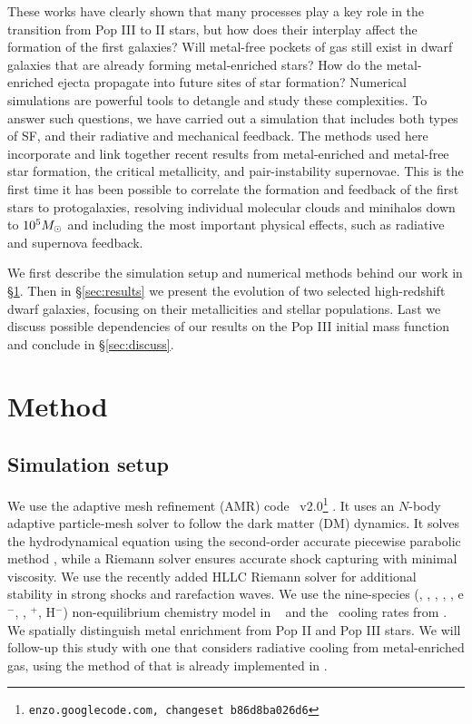 \documentclass[apjl]{emulateapj}
\begin{document}
These works have clearly shown that many processes play a key role in
the transition from Pop III to II stars, but how does their interplay
affect the formation of the first galaxies?  Will metal-free pockets
of gas still exist in dwarf galaxies that are already forming
metal-enriched stars?  How do the metal-enriched ejecta propagate into
future sites of star formation?  Numerical simulations are powerful
tools to detangle and study these complexities.  To answer such
questions, we have carried out a simulation that includes both types
of SF, and their radiative and mechanical feedback.  The methods used
here incorporate and link together recent results from metal-enriched
and metal-free star formation, the critical metallicity, and
pair-instability supernovae.  This is the first time it has been
possible to correlate the formation and feedback of the first stars to
protogalaxies, resolving individual molecular clouds and minihalos
down to $10^5 \Ms$ and including the most important physical effects,
such as radiative and supernova feedback.

We first describe the simulation setup and numerical methods behind
our work in \S\ref{sec:setup}.  Then in \S\ref{sec:results} we present
the evolution of two selected high-redshift dwarf galaxies, focusing
on their metallicities and stellar populations.  Last we discuss
possible dependencies of our results on the Pop III initial mass
function and conclude in \S\ref{sec:discuss}.

\section{Method}
\label{sec:setup}

\subsection{Simulation setup}

We use the adaptive mesh refinement (AMR) code
\enzo~v2.0\footnote{\texttt{enzo.googlecode.com, changeset
    b86d8ba026d6}} \citep{OShea2004}.  It uses an $N$-body adaptive
particle-mesh solver \citep{Efstathiou85, Couchman91, BryanNorman1997}
to follow the dark matter (DM) dynamics.  It solves the hydrodynamical
equation using the second-order accurate piecewise parabolic method
\citep{Woodward84, Bryan95}, while a Riemann solver ensures accurate
shock capturing with minimal viscosity.  We use the recently added
HLLC Riemann solver \citep{Toro94_HLLC} for additional stability in
strong shocks and rarefaction waves.  We use the nine-species
(, , , , , e$^-$,
\hh, \hh$^+$, H$^-$) non-equilibrium chemistry model in
\enzo~\citep{Abel97, Anninos97} and the \hh~cooling rates from
\citet{Glover08_Rates}.  We spatially distinguish metal enrichment
from Pop II and Pop III stars.  We will follow-up this study with one
that considers radiative cooling from metal-enriched gas, using the
method of \citet{2008MNRAS.385.1443S} that is already implemented in
\enzo.
\end{document}
